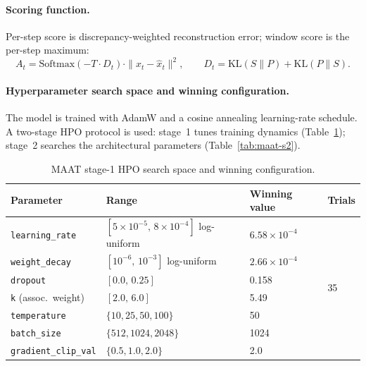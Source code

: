 \paragraph{Scoring function.}
Per-step score is discrepancy-weighted reconstruction error; window score is the per-step maximum:
\begin{equation}
    A_t = \mathrm{Softmax}(-T \cdot D_t) \cdot \|x_t - \hat{x}_t\|^2, \qquad D_t = \mathrm{KL}(S\|P)+\mathrm{KL}(P\|S).
\end{equation}

\paragraph{Hyperparameter search space and winning configuration.}
The model is trained with AdamW and a cosine annealing learning-rate schedule. A two-stage HPO protocol is used: stage~1 tunes training dynamics (Table~\ref{tab:maat-s1}); stage~2 searches the architectural parameters (Table~\ref{tab:maat-s2}).

\begin{table}[H]
\centering
\caption{MAAT stage-1 HPO search space and winning configuration.\label{tab:maat-s1}}
\begin{tabular}{llll}
\toprule
\textbf{Parameter} & \textbf{Range} & \textbf{Winning value} & \textbf{Trials} \\
\midrule
\texttt{learning\_rate}      & $[5\times10^{-5},\,8\times10^{-4}]$ log-uniform & $6.58\times10^{-4}$ & \multirow{7}{*}{35} \\
\texttt{weight\_decay}       & $[10^{-6},\,10^{-3}]$ log-uniform              & $2.66\times10^{-4}$ & \\
\texttt{dropout}             & $[0.0,\,0.25]$                                  & 0.158               & \\
\texttt{k} (assoc.\ weight)  & $[2.0,\,6.0]$                                   & 5.49                & \\
\texttt{temperature}         & $\{10,25,50,100\}$                              & 50                  & \\
\texttt{batch\_size}         & $\{512,1024,2048\}$                             & 1024                & \\
\texttt{gradient\_clip\_val} & $\{0.5,1.0,2.0\}$                               & 2.0                 & \\
\bottomrule
\end{tabular}
\end{table}

